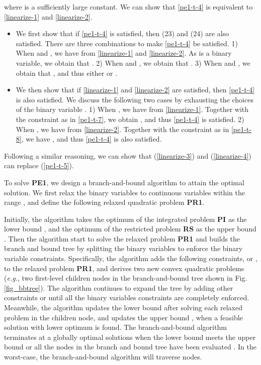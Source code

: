 \documentclass[journal]{IEEEtran}
\begin{document}
	where  is a sufficiently large constant. We can show that \eqref{pe1-t-4} is equivalent to \eqref{linearize-1} and \eqref{linearize-2}. 
	\begin{itemize}
		\item We first show that if \eqref{pe1-t-4} is satisfied, then (23) and (24) are also satisfied. There are three combinations to make \eqref{pe1-t-4} be satisfied. 1) When  and , we have  from \eqref{linearize-1} and \eqref{linearize-2}. As  is a binary variable, we obtain that . 2) When  and , we obtain that . 3) When  and , we obtain that , and thus either  or .
		\item We then show that if \eqref{linearize-1} and \eqref{linearize-2} are satisfied, then \eqref{pe1-t-4} is also satisfied. We discuss the following two cases by exhausting the choices of the binary variable . 1) When , we have  from \eqref{linearize-1}. Together with the constraint  as in \eqref{pe1-t-7}, we obtain , and thus \eqref{pe1-t-4} is satisfied. 2) When , we have  from \eqref{linearize-2}. Together with the constraint  as in \eqref{pe1-t-8}, we have , and thus \eqref{pe1-t-4} is also satisfied. 
	\end{itemize}
		Following a similar reasoning, we can show that (\ref{linearize-3}) and (\ref{linearize-4}) can replace (\ref{pe1-t-5}).
	
	To solve \textbf{PE1}, we design a branch-and-bound algorithm \cite{bilevel} to attain the optimal solution. We first relax the binary variables  to continuous variables within the range , and define the following relaxed quadratic problem \textbf{PR1}.
	
	
	
		
	Initially, the algorithm takes the optimum of the integrated problem \textbf{PI} as the lower bound , and the optimum of the restricted problem \textbf{RS} as the upper bound . Then the algorithm start to solve the relaxed problem \textbf{PR1} and builds the branch and bound tree by splitting the binary variables to enforce the binary variable constraints. Specifically, the algorithm adds the following constraints,  or , to the relaxed problem \textbf{PR1}, and derives two new convex quadratic problems (\textit{e.g.}, two first-level children nodes in the branch-and-bound tree shown in Fig. \ref{fig_bbtree}). The algorithm continues to expand the tree by adding other constraints  or  until all the binary variables constraints are completely enforced. Meanwhile, the algorithm updates the lower bound  after solving each relaxed problem in the children node, and updates the upper bound , when a feasible solution with lower optimum is found. The branch-and-bound algorithm terminates at a globally optimal solutions when the lower bound meets the upper bound or all the nodes in the branch and bound tree have been evaluated \cite{bilevel}. In the worst-case, the branch-and-bound algorithm will traverse  nodes.
	
\end{document}
